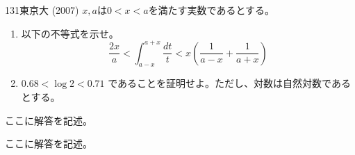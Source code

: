 \begin{prob}{131}{}{東京大 (2007)}
 $x, a$は$0<x<a$を満たす実数であるとする。
 \begin{enumerate}
  \item 以下の不等式を示せ。
	\[ \frac{2x}{a} < \int_{a-x}^{a+x}\! \frac{dt}{t} < x\left(\frac{1}{a-x}+\frac{1}{a+x}\right) \]
  \item $0.68 < \log 2 < 0.71$ であることを証明せよ。ただし、対数は自然対数であるとする。
 \end{enumerate}
\end{prob}
ここに解答を記述。

ここに解答を記述。
